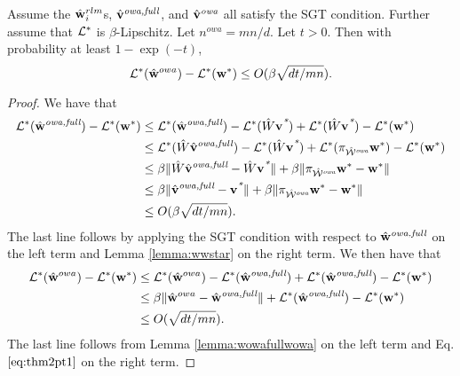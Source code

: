 \documentclass[thesis.tex]{subfiles}
\newcommand{\nowa}{n^{\textit{owa}}}
\begin{document}
\begin{theorem}
Assume the $\hat{\mathbf w}^{rlm}_i$s, $\hat{\mathbf{v}}^{\textit{owa,full}}$, and $\hat{\mathbf{v}}^{\textit{owa}}$ all satisfy the SGT condition.
Further assume that $\mathcal{L}^*$ is $\beta$-Lipschitz.
Let $\nowa=mn/d$.
Let $t>0$.
Then with probability at least $1-\exp(-t)$,
\begin{equation}
    \mathcal{L}^*(\hat{\mathbf w}^{owa})-\mathcal{L}^*({\mathbf w^{*}})
    \le O(\beta\sqrt{dt/mn}).
\end{equation}
\end{theorem}

\begin{proof}
We have that
\begin{align}
    \Lossstar(\wowafull) - \Lossstar(\wstar)
    & \le \Lossstar(\wowafull) - \Lossstar(\matW\vstar) + \Lossstar(\matW\vstar) - \Lossstar(\wstar)
    \\
    & \le \Lossstar(\matW\vfull) - \Lossstar(\matW\vstar) + \Lossstar(\proj{\Wowa}\wstar) -\Lossstar(\wstar)
    \\
    & \le \beta\ltwo{\matW\vfull - \matW\vstar} + \beta\ltwo{\proj{\Wowa}\wstar -\wstar}
    \\
    & \le \beta\ltwo{\vfull - \vstar} + \beta\ltwo{\proj{\Wowa}\wstar -\wstar}
    \\
    & \le O(\beta\sqrt{dt/mn})
    \label{eq:thm2pt1}
    .
\end{align}
The last line follows by applying the SGT condition with respect to $\hat{\mathbf w}^{\textit{owa,full}}$ on the left term and Lemma \ref{lemma:wwstar} on the right term.
We then have that
\begin{align}
    \mathcal{L}^*(\hat{\mathbf w}^{owa})-\mathcal{L}^*({\mathbf w^{*}})
    &\le
    \mathcal{L}^*(\hat{\mathbf w}^{owa})-\mathcal{L}^*(\hat{\mathbf w}^{\textit{owa,full}})
    +
    \mathcal{L}^*(\hat{\mathbf w}^{\textit{owa,full}})-\mathcal{L}^*({\mathbf w^{*}})
    \\
    &\le
    \beta{\lVert {\hat{\mathbf w}^{owa}-\hat{\mathbf w}^{\textit{owa,full}}} \rVert}
    +
    \mathcal{L}^*(\hat{\mathbf w}^{\textit{owa,full}})-\mathcal{L}^*({\mathbf w^{*}})
    \\
    &\le
    O(\sqrt{dt/mn}).
\end{align}
The last line follows from Lemma \ref{lemma:wowafullwowa} on the left term and Eq. $\eqref{eq:thm2pt1}$ on the right term.
\end{proof}
\end{document}
